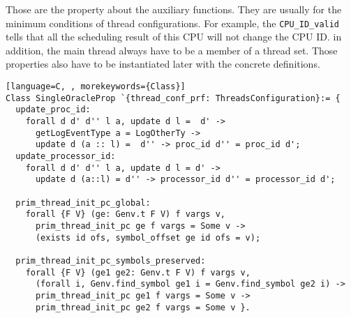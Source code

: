 Those are the property about the auxiliary functions. 
They are usually for the minimum conditions of 
thread configurations. 
For example, 
the \lstinline$CPU_ID_valid$ tells that all the scheduling result of this CPU 
will not change the CPU ID. 
in addition, 
the main thread always have to be a member of a thread set. 
Those properties also have to be instantiated later with the concrete definitions.

%
%
%
%
%
%
%
%       
%
\begin{lstlisting}[language=C, , morekeywords={Class}]
Class SingleOracleProp `{thread_conf_prf: ThreadsConfiguration}:= {
  update_proc_id:
    forall d d' d'' l a, update d l =  d' ->
      getLogEventType a = LogOtherTy ->
      update d (a :: l) =  d'' -> proc_id d'' = proc_id d';
  update_processor_id:
    forall d d' d'' l a, update d l = d' -> 
      update d (a::l) = d'' -> processor_id d'' = processor_id d';
       
  prim_thread_init_pc_global:
    forall {F V} (ge: Genv.t F V) f vargs v,
      prim_thread_init_pc ge f vargs = Some v ->
      (exists id ofs, symbol_offset ge id ofs = v);

  prim_thread_init_pc_symbols_preserved:
    forall {F V} (ge1 ge2: Genv.t F V) f vargs v,
      (forall i, Genv.find_symbol ge1 i = Genv.find_symbol ge2 i) ->
      prim_thread_init_pc ge1 f vargs = Some v ->
      prim_thread_init_pc ge2 f vargs = Some v }.
\end{lstlisting}


